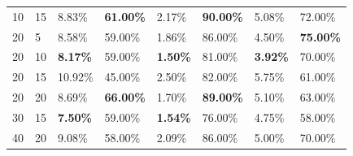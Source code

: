 \begin{table}[h]
\begin{tabular}{llllllll}
    10    & 15     & 8.83\%          & \textbf{61.00\%}                                                                         & 2.17\%          & \textbf{90.00\%}                                                                         & 5.08\%          & 72.00\%                                                                                  \\
    20    & 5      & 8.58\%          & 59.00\%                                                                                  & 1.86\%          & 86.00\%                                                                                  & 4.50\%          & \textbf{75.00\%}                                                                         \\
    20    & 10     & \textbf{8.17\%} & 59.00\%                                                                                  & \textbf{1.50\%} & 81.00\%                                                                                  & \textbf{3.92\%} & 70.00\%                                                                                  \\
    20    & 15     & 10.92\%         & 45.00\%                                                                                  & 2.50\%          & 82.00\%                                                                                  & 5.75\%          & 61.00\%                                                                                  \\
    20    & 20     & 8.69\%          & \textbf{66.00\%}                                                                         & 1.70\%          & \textbf{89.00\%}                                                                         & 5.10\%          & 63.00\%                                                                                  \\
    30    & 15     & \textbf{7.50\%} & 59.00\%                                                                                  & \textbf{1.54\%} & 76.00\%                                                                                  & 4.75\%          & 58.00\%                                                                                  \\
    40    & 20     & 9.08\%          & 58.00\%                                                                                  & 2.09\%          & 86.00\%                                                                                  & 5.00\%          & 70.00\%                                                                                  \\ \hline
    \end{tabular}
    \label{quadruplet-hard-margin}
\end{table}

